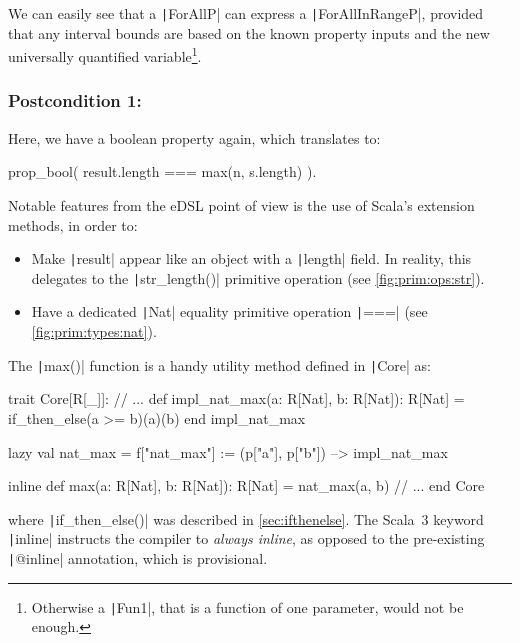 \documentclass[11pt]{article}
\newcommand{\Scala}[1]{\texttt|#1|}
\newcommand{\ScalaI}[1]{\texttt|#1|}
\begin{document}
\noindent We can easily see that a \ScalaI{ForAllP} can express a \ScalaI{ForAllInRangeP}, provided that any interval bounds are based on the known property inputs and the new universally quantified variable\footnote{Otherwise a \ScalaI{Fun1}, that is a function of one parameter, would not be enough.}.

\subsubsection*{Postcondition 1: \leftpadposta}

\noindent Here, we have a boolean property again, which translates to:

\begin{ScalaBlockSimple}
prop_bool( result.length === max(n, s.length) ).
\end{ScalaBlockSimple}

\noindent Notable features from the eDSL point of view is the use of Scala's extension methods, in order to:

\begin{itemize}
  \item Make \ScalaI{result} appear like an object with a \ScalaI{length} field. In reality, this delegates to the \ScalaI{str_length()} primitive operation (see \autoref{fig:prim:ops:str}).
  
  \item Have a dedicated \Scala{Nat} equality primitive operation \ScalaI{===} (see \autoref{fig:prim:types:nat}).
\end{itemize}

\noindent The \ScalaI{max()} function is a handy utility method defined in \ScalaI{Core} as:

\begin{ScalaBlockSimple}
trait Core[R[_]]:
  // ...
  def impl_nat_max(a: R[Nat], b: R[Nat]): R[Nat] =
    if_then_else(a >= b)(a)(b)
  end impl_nat_max

  lazy val nat_max = f["nat_max"] := (p["a"], p["b"]) --> impl_nat_max
  
  inline def max(a: R[Nat], b: R[Nat]): R[Nat] = nat_max(a, b)
  // ...
end Core
\end{ScalaBlockSimple} 

\noindent where \ScalaI{if_then_else()} was described in \autoref{sec:ifthenelse}. The Scala~3 keyword \ScalaI{inline} instructs the compiler to \textit{always inline}, as opposed to the pre-existing \ScalaI{@inline} annotation, which is provisional.
\end{document}
